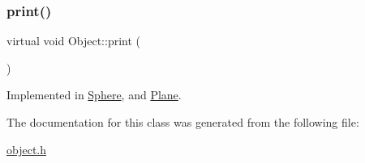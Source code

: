 \subsubsection{\texorpdfstring{print()}{print()}}
{\footnotesize\ttfamily virtual void Object\+::print (\begin{DoxyParamCaption}{ }\end{DoxyParamCaption})\hspace{0.3cm}{\ttfamily [pure virtual]}}



Implemented in \mbox{\hyperlink{class_sphere_a95537121c5308b7b250f4a53171303ef}{Sphere}}, and \mbox{\hyperlink{class_plane_a3d9139793b931279e3dcd1fd80a263c7}{Plane}}.



The documentation for this class was generated from the following file\+:\begin{DoxyCompactItemize}
\item 
\mbox{\hyperlink{object_8h}{object.\+h}}\end{DoxyCompactItemize}
